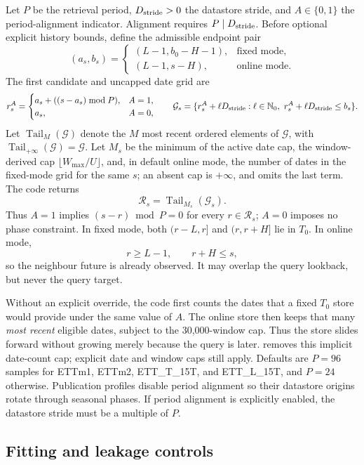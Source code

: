 \documentclass[10pt]{article}
\newcommand{\code}[1]{\texttt{\detokenize{#1}}}
\newcommand{\Tzero}{T_0}
\begin{document}
Let $P$ be the retrieval period, $D_{\rm stride}>0$ the datastore stride, and
$A\in\{0,1\}$ the period-alignment indicator. Alignment requires
$P\mid D_{\rm stride}$. Before optional explicit history bounds, define the
admissible endpoint pair
\[
 (a_s,b_s)=
 \begin{cases}
  (L-1,b_0-H-1),&\text{fixed mode},\\
  (L-1,s-H),&\text{online mode}.
 \end{cases}
\]
The first candidate and uncapped date grid are
\[
 r_s^{A}=\begin{cases}
 a_s+((s-a_s)\bmod P),&A=1,\\
 a_s,&A=0,
 \end{cases}
 \qquad
 \mathcal G_s=\{r_s^{A}+\ell D_{\rm stride}:\ell\in\mathbb N_0,\
 r_s^{A}+\ell D_{\rm stride}\leq b_s\}.
\]
Let $\operatorname{Tail}_M(\mathcal G)$ denote the $M$ most recent ordered
elements of $\mathcal G$, with
$\operatorname{Tail}_{+\infty}(\mathcal G)=\mathcal G$. Let $M_s$ be the
minimum of the active date cap, the
window-derived cap $\lfloor W_{\max}/U\rfloor$, and, in default online mode,
the number of dates in the fixed-mode grid for the same $s$; an absent cap is
$+\infty$, and \code{full_online_history} omits the last term. The code returns
\[
 \mathcal R_s=\operatorname{Tail}_{M_s}(\mathcal G_s).
\]
Thus $A=1$ implies $(s-r)\bmod P=0$ for every
$r\in\mathcal R_s$; $A=0$ imposes no phase constraint.
In fixed mode, both $(r-L,r]$ and $(r,r+H]$ lie in $\Tzero$. In online mode,
\[
 r\geq L-1,\qquad r+H\leq s,
\]
so the neighbour future is already observed. It may overlap the query
lookback, but never the query target.

Without an explicit override, the code first counts the dates that a fixed
$\Tzero$ store would provide under the same value of $A$. The online
store then keeps that many \emph{most recent} eligible dates, subject to the
30,000-window cap. Thus the store slides forward without growing merely
because the query is later. \code{full_online_history} removes this implicit
date-count cap; explicit date and window caps still apply. Defaults are
$P=96$ samples for ETTm1, ETTm2, ETT\_T\_15T, and ETT\_L\_15T, and $P=24$
otherwise. Publication profiles disable period alignment so their datastore
origins rotate through seasonal phases. If period alignment is explicitly
enabled, the datastore stride must be a multiple of $P$.

\subsection{Fitting and leakage controls}
\end{document}
